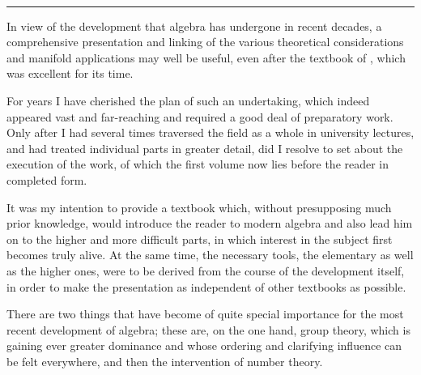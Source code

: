 \begin{center}
{\Large {}}\\[1ex]
\rule{4em}{0.4pt}
\end{center}

In view of the development that algebra has undergone in recent decades, a comprehensive presentation and linking of the various theoretical considerations and manifold applications may well be useful, even after the textbook of , which was excellent for its time.

For years I have cherished the plan of such an undertaking, which indeed appeared vast and far-reaching and required a good deal of preparatory work. Only after I had several times traversed the field as a whole in university lectures, and had treated individual parts in greater detail, did I resolve to set about the execution of the work, of which the first volume now lies before the reader in completed form.

It was my intention to provide a textbook which, without presupposing much prior knowledge, would introduce the reader to modern algebra and also lead him on to the higher and more difficult parts, in which interest in the subject first becomes truly alive. At the same time, the necessary tools, the elementary as well as the higher ones, were to be derived from the course of the development itself, in order to make the presentation as independent of other textbooks as possible.

There are two things that have become of quite special importance for the most recent development of algebra; these are, on the one hand, group theory, which is gaining ever greater dominance and whose ordering and clarifying influence can be felt everywhere, and then the intervention of number theory.
